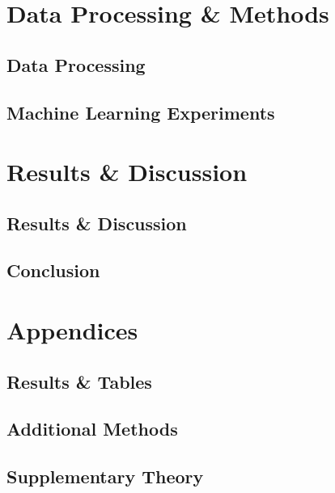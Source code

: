 \documentclass[a4paper, USenglish, 11pt]{report}
\begin{document}
\part{Data Processing \& Methods}
\chapter{Data Processing}
\label{sec:data_processing}

\chapter{Machine Learning Experiments}



\part{Results \& Discussion}
\chapter{Results \& Discussion}


% 

\chapter{Conclusion}



\part{Appendices}
\appendix
\chapter{Results \& Tables}\label{sec:appendix_a}


\chapter{Additional Methods}\label{sec:appendix_b}

\chapter{Supplementary Theory}
\label{sec:appendix_c}

\newpage


\end{document}
